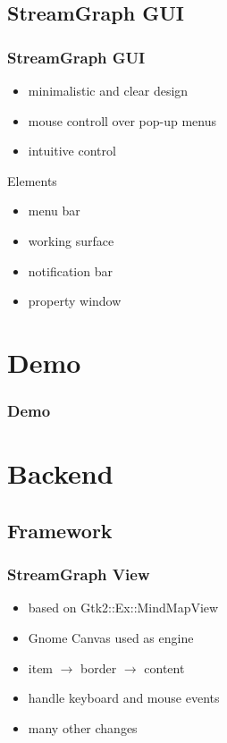\documentclass{beamer}
\begin{document}
\subsection{StreamGraph GUI}
\begin{frame}
\frametitle{StreamGraph GUI}
	\begin{itemize}
		\item minimalistic and clear design
		\item mouse controll over pop-up menus
		\item intuitive control
	\end{itemize}
	\begin{block}{Elements}
		\begin{itemize}
			\item menu bar
			\item working surface
			\item notification bar
			\item property window
		\end{itemize}
	\end{block}
\end{frame}


\section{Demo}
\begin{frame}
\frametitle{Demo}
\end{frame}


\section{Backend}

\subsection{Framework}
\begin{frame}
\frametitle{StreamGraph View}
 \begin{itemize}
 	\item based on Gtk2::Ex::MindMapView \cite{GTK2EXMindMapView}
	\item Gnome Canvas used as engine
	\item item $\rightarrow$ border $\rightarrow$ content
	\item handle keyboard and mouse events
	\item many other changes
 \end{itemize}
\end{frame}
\end{document}
